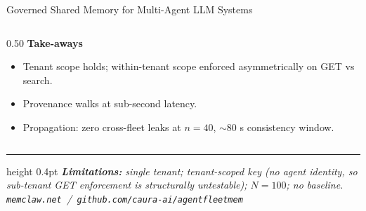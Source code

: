 \documentclass[10pt,aspectratio=169]{beamer}
\begin{document}
\begin{frame}{Governed Shared Memory for Multi-Agent LLM Systems}
\begin{columns}[T,onlytextwidth]
\begin{column}{0.50\textwidth}
\textbf{Take-aways}
\begin{itemize}\setlength\itemsep{0.1em}\setlength\parskip{0pt}
  \item Tenant scope holds; within-tenant scope enforced asymmetrically
        on \textcolor{warn}{GET vs search}.
  \item Provenance walks at \textcolor{good}{sub-second latency}.
  \item Propagation: \textcolor{good}{zero cross-fleet leaks at $n=40$},
        \textcolor{warn}{$\sim$80 s consistency window}.
\end{itemize}

\end{column}

\end{columns}

\vspace{0.3em}
\hrule height 0.4pt
\vspace{0.2em}
{\scriptsize\itshape
\textbf{Limitations:} single tenant; tenant-scoped key (no agent
identity, so sub-tenant GET enforcement is structurally untestable);
$N=100$; no baseline. \hfill
\texttt{memclaw.net} \,/\, \texttt{github.com/caura-ai/agentfleetmem}}

\end{frame}
\end{document}

